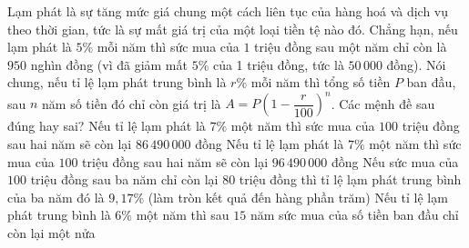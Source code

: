 \begin{ex}%
 Lạm phát là sự tăng mức giá chung một cách liên tục của hàng hoá và dịch vụ theo thời gian, tức là sự mất giá trị của một loại tiền tệ nào đó. Chẳng hạn, nếu lạm phát là $5\%$ mỗi năm thì sức mua của $1$ triệu đồng sau một năm chỉ còn  là $950$
 nghìn đồng (vì đã giảm mất $5\%$ của 1 triệu đồng, tức là $50\,000$ đồng). Nói chung, nếu tỉ lệ lạm phát trung bình là $r\%$ mỗi năm thì tổng số tiền $P$ ban đầu, sau $n$ năm số tiền đó chỉ còn giá trị là $A=P\left(1-\dfrac{r}{100}\right)^n$. Các mệnh  đề sau đúng hay sai?
  \choiceTF
  {\True Nếu tỉ lệ lạm phát là $7\%$ một năm thì sức mua của $100$ triệu đồng sau hai  năm sẽ còn lại $86\,490\,000$ đồng}
  {Nếu tỉ lệ lạm phát là $7\%$  một năm thì sức mua của $100$ triệu đồng sau hai năm sẽ còn lại $96\,490\,000$ đồng}
  {Nếu sức mua của $100$  triệu đồng sau ba năm chỉ còn lại $80$ triệu đồng thì tỉ lệ lạm phát trung bình của ba năm đó là $9{,}17\%$ (làm tròn kết quả đến hàng phần trăm)}
  {Nếu tỉ lệ lạm phát trung bình là $6\%$ một  năm thì sau $15$ năm sức mua của số tiền ban đầu chỉ còn lại một nửa}
\end{ex}

